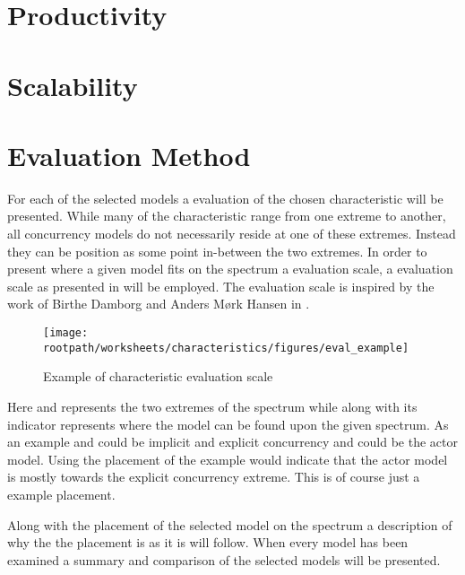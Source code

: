 \section{Productivity}

\section{Scalability}

\section{Evaluation Method}
For each of the selected models a evaluation of the chosen characteristic will be presented. While many of the characteristic range from one extreme to another, all concurrency models do not necessarily reside at one of these extremes. Instead they can be position as some point in-between the two extremes. In order to present where a given model fits on the spectrum a evaluation scale, a evaluation scale as presented in  will be employed. The evaluation scale is inspired by the work of Birthe Damborg and Anders Mørk Hansen in \cite{StudyInConcurrency}.

\begin{figure}[ht!]
\centering
\texttt{[image: \\rootpath/worksheets/characteristics/figures/eval\_example]}
\caption{Example of characteristic evaluation scale}\label{fig:char_evel_example}
\end{figure}

Here  and  represents the two extremes of the spectrum while  along with its indicator represents where the model  can be found upon the given spectrum. As an example  and  could be implicit and explicit concurrency and  could be the actor model. Using the placement of the example  would indicate that the actor model is mostly towards the explicit concurrency extreme. This is of course just a example placement.

Along with the placement of the selected model on the spectrum a description of why the the placement is as it is will follow. When every model has been examined a summary and comparison of the selected models will be presented.
\worksheetend
